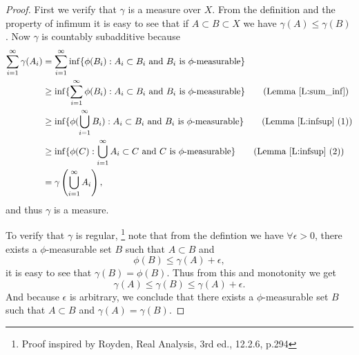 \begin{proof}
First we verify that $\gamma$ is a measure over $X$. From the definition and the 
property of infimum it is easy to see that if $A\subset B\subset X$ we have
$\gamma(A)\le\gamma(B)$. Now $\gamma$ is countably subadditive because
\begin{align*}
  \sum_{i=1}^{\infty} \gamma(A_i)
    &= \sum_{i=1}^{\infty} 
      \inf\{\phi(B_i): \text{$A_i\subset B_i$ and $B_i$ is $\phi$-measurable} \}
      \notag \\
    &\ge \inf \{ 
         \sum_{i=1}^{\infty} 
         \phi(B_i): \text{$A_i\subset B_i$ and $B_i$ is $\phi$-measurable} \}
       \qquad \text{(Lemma \ref{L:sum_inf})}    \notag \\
    &\ge \inf \{ 
         \phi(\bigcup_{i=1}^{\infty} B_i): 
             \text{$A_i\subset B_i$ and $B_i$ is $\phi$-measurable} \}
       \qquad \text{(Lemma \ref{L:infsup} (1))}    \notag \\
    &\ge 
      \inf \{ \phi(C):
      \text{$\bigcup_{i=1}^{\infty} A_i\subset C$ and $C$ is $\phi$-measurable} 
      \}       \qquad \text{(Lemma \ref{L:infsup} (2))}    \notag \\
    &= \gamma\left( \bigcup_{i=1}^{\infty} A_i \right),  \notag
\end{align*}
and thus $\gamma$ is a measure.

To verify that $\gamma$ is regular, 
\footnote{Proof inspired by Royden, Real Analysis, 3rd ed., 12.2.6, p.294}
note that from the defintion we have 
$\forall\epsilon>0$, there exists a $\phi$-measurable set $B$ such that
$A\subset B$ and 
\[
  \phi(B)\le \gamma(A)+\epsilon,
\]
it is easy to see that $\gamma(B)=\phi(B)$. Thus from this and monotonity we get
\[
  \gamma(A)\le \gamma(B) \le \gamma(A)+\epsilon.
\]
And because $\epsilon$ is arbitrary, we conclude that there exists a
$\phi$-measurable set $B$ such that $A\subset B$ and $\gamma(A)=\gamma(B)$.


\end{proof}

